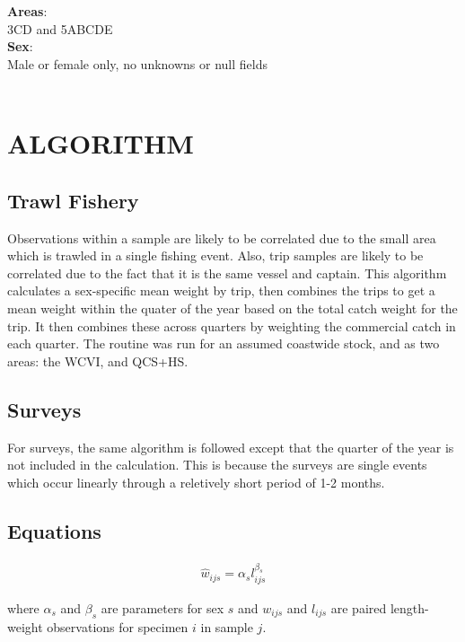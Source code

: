 \textbf{Areas}: \\
3CD and 5ABCDE
\mbox{ }\\

\textbf{Sex}: \\
Male or female only, no unknowns or null fields \\
\mbox{ }\\

\section{ALGORITHM}

\subsection{Trawl Fishery}
Observations within a sample are likely to be correlated due to the small area which is trawled in a single fishing event. Also, trip samples
are likely to be correlated due to the fact that it is the same vessel and captain. This algorithm calculates a sex-specific mean weight by
trip, then combines the trips to get a mean weight within the quater of the year based on the total catch weight for the trip. It then combines
these across quarters by weighting the commercial catch in each quarter. The routine was run for an assumed coastwide stock, and as two areas:
the WCVI, and QCS+HS.

\subsection{Surveys}
For surveys, the same algorithm is followed except that the quarter of the year is not included in the calculation. This is because the surveys are
single events which occur linearly through a reletively short period of 1-2 months.

\subsection{Equations}

\begin{align} \label{eq:lw}
\hat{w}_{ijs}=\alpha_sl_{ijs}^{\beta_s}
\end{align}
\begin{addmargin}[3em]{1em}
where $\alpha_s$ and $\beta_s$ are parameters for sex $s$ and $w_{ijs}$ and $l_{ijs}$ are paired length-weight observations for specimen $i$ in sample $j$.
\end{addmargin}

